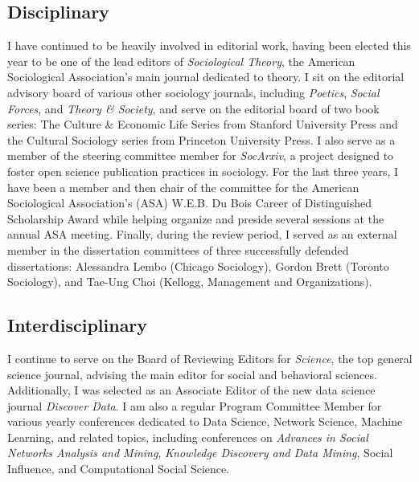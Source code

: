 \documentclass[a4paper,11pt]{extarticle}
\begin{document}
\subsection*{Disciplinary}
I have continued to be heavily involved in editorial work, having been elected this year to be one of the lead editors of \textit{Sociological Theory}, the American Sociological Association's main journal dedicated to theory. I sit on the editorial advisory board of various other sociology journals, including \textit{Poetics}, \textit{Social Forces}, and \textit{Theory \& Society}, and serve on the editorial board of two book series: The Culture \& Economic Life Series from Stanford University Press and the Cultural Sociology series from Princeton University Press. I also serve as a member of the steering committee member for \textit{SocArxiv}, a project designed to foster open science publication practices in sociology. For the last three years, I have been a  member and then chair of the committee for the American Sociological Association's (ASA) W.E.B. Du Bois Career of Distinguished Scholarship Award while helping organize and preside several sessions at the annual ASA meeting. Finally, during the review period, I served as an external member in the dissertation committees of three successfully defended dissertations: Alessandra Lembo (Chicago Sociology), Gordon Brett (Toronto Sociology), and Tae-Ung Choi (Kellogg, Management and Organizations). 

\subsection*{Interdisciplinary}
I continue to serve on the Board of Reviewing Editors for \textit{Science}, the top general science journal, advising the main editor for social and behavioral sciences. Additionally, I was selected as an Associate Editor of the new data science journal \textit{Discover Data}. I am also a regular Program Committee Member for various yearly conferences dedicated to Data Science, Network Science, Machine Learning, and related topics, including conferences on \textit{Advances in Social Networks Analysis and Mining}, \textit{Knowledge Discovery and Data Mining}, Social Influence, and Computational Social Science.
\end{document}
